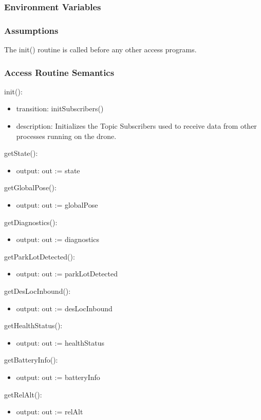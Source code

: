 \documentclass[12pt, titlepage]{article}
\begin{document}
\subsubsection{Environment Variables}
\subsubsection{Assumptions}
The init() routine is called before any other access programs.
\subsubsection{Access Routine Semantics}
\noindent init():
\begin{itemize}
\item transition: initSubscribers()
\item description: Initializes the Topic Subscribers used to receive data from other processes running on the drone.
\end{itemize}
\noindent getState():
\begin{itemize}
\item output: out := state 
\end{itemize}
\noindent getGlobalPose():
\begin{itemize}
\item output: out := globalPose 
\end{itemize}
\noindent getDiagnostics():
\begin{itemize}
\item output: out := diagnostics 
\end{itemize}
\noindent getParkLotDetected():
\begin{itemize}
\item output: out := parkLotDetected 
\end{itemize}
\noindent getDesLocInbound():
\begin{itemize}
\item output: out := desLocInbound 
\end{itemize}
\noindent getHealthStatus():
\begin{itemize}
\item output: out := healthStatus 
\end{itemize}
\noindent getBatteryInfo():
\begin{itemize}
\item output: out := batteryInfo 
\end{itemize}
\noindent getRelAlt():
\begin{itemize}
\item output: out := relAlt 
\end{itemize}
\end{document}
